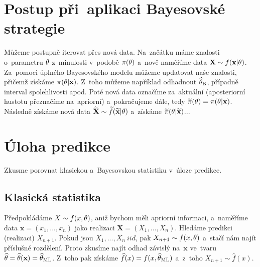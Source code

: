 \section*{Postup při~aplikaci Bayesovské strategie} 
Můžeme postupně iterovat přes nová data. Na~začátku máme znalosti o~parametru $\theta$ z~minulosti v~podobě $\pi(\theta)$ a~nově naměříme data $\textbf{X}\sim f(\textbf{x}|\theta)$. Za~pomoci úplného Bayesovského modelu můžeme updatovat naše znalosti, přičemž získáme $\pi(\theta|\textbf{x})$. Z~toho můžeme například odhadnout $\widehat{\theta}_\mathrm{B}$, případně interval spolehlivosti apod. Poté nová data označíme za~aktuální (aposteriorní hustotu přeznačíme na~apriorní) a~pokračujeme dále, tedy $\widetilde{\pi}(\theta)=\pi(\theta|\textbf{x})$. Následně získáme nová data $\widetilde{\textbf{X}}\sim\widetilde{f}(\widetilde{\textbf{x}}|\theta)$ a~získáme $\widetilde{\pi}(\theta|\widetilde{\textbf{x}})$... 

\section{Úloha predikce}
Zkusme porovnat klasickou a~Bayesovskou statistiku v~úloze predikce.

	\subsection*{Klasická statistika}
	 Předpokládáme $X\sim f(x,\theta)$, aniž bychom měli apriorní informaci, a~naměříme data $\textbf{x}=(x_1,...,x_n)$ jako realizaci $\textbf{X}=(X_1,...,X_n)$. Hledáme predikci (realizaci) $X_{n+1}$. Pokud jsou $X_1,...,X_n ~iid$, pak $X_{n+1}\sim f(x,\theta)$ a~stačí nám najít příslušné rozdělení. Proto zkusíme najít odhad závislý na~$\textbf{x}$ ve~tvaru $\widehat{\theta}=\widehat{\theta}(\textbf{x})=\widehat{\theta}_{\mathrm{ML}}$. Z~toho pak získáme $\widehat{f}(x)=f(x,\widehat{\theta}_\mathrm{ML})$ a~z~toho $X_{n+1}\sim\widehat{f}(x)$.
